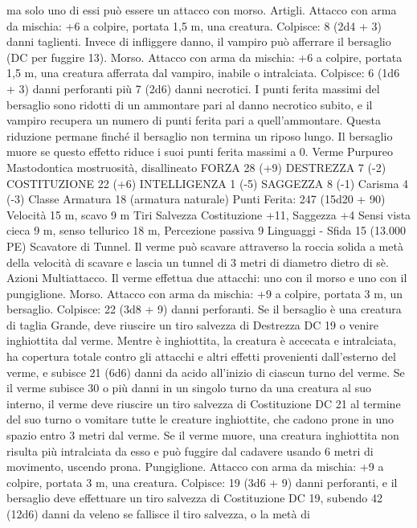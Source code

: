 \begin{multicols}{2}
ma solo uno di essi può essere un attacco con morso.
Artigli. Attacco con arma da mischia: +6 a colpire, portata 1,5
m, una creatura.
Colpisce: 8 (2d4 + 3) danni taglienti. Invece di infliggere danno,
il vampiro può afferrare il bersaglio (DC per fuggire 13).
Morso. Attacco con arma da mischia: +6 a colpire, portata 1,5 m,
una creatura afferrata dal vampiro, inabile o intralciata.
Colpisce: 6 (1d6 + 3) danni perforanti più 7 (2d6) danni necrotici. I
punti ferita massimi del bersaglio sono ridotti di un ammontare pari
al danno necrotico subito, e il vampiro recupera un numero di punti
ferita pari a quell’ammontare. Questa riduzione permane finché il
bersaglio non termina un riposo lungo. Il bersaglio muore se questo
effetto riduce i suoi punti ferita massimi a 0.
Verme Purpureo
Mastodontica mostruosità, disallineato
FORZA 28 (+9)
DESTREZZA 7 (-2)
COSTITUZIONE 22 (+6)
INTELLIGENZA 1 (-5)
SAGGEZZA 8 (-1)
Carisma 4 (-3)
Classe Armatura 18 (armatura naturale)
\hspace*{0pt}\hfill{Punti Ferita}: 247 (15d20 + 90)
Velocità 15 m, scavo 9 m
Tiri Salvezza Costituzione +11, Saggezza +4
Sensi vista cieca 9 m, senso tellurico 18 m, Percezione passiva 9
Linguaggi -
Sfida 15 (13.000 PE)
Scavatore di Tunnel. Il verme può scavare attraverso la roccia
solida a metà della velocità di scavare e lascia un tunnel di 3
metri di diametro dietro di sè.
Azioni
Multiattacco. Il verme effettua due attacchi: uno con il morso e
uno con il pungiglione.
Morso. Attacco con arma da mischia: +9 a colpire, portata 3 m,
un bersaglio.
Colpisce: 22 (3d8 + 9) danni perforanti. Se il bersaglio è una
creatura di taglia Grande, deve riuscire un tiro salvezza di
Destrezza DC 19 o venire inghiottita dal verme. Mentre è
inghiottita, la creatura è accecata e intralciata, ha copertura totale
contro gli attacchi e altri effetti provenienti dall’esterno del
verme, e subisce 21 (6d6) danni da acido all’inizio di ciascun
turno del verme.
Se il verme subisce 30 o più danni in un singolo turno da una
creatura al suo interno, il verme deve riuscire un tiro salvezza di
Costituzione DC 21 al termine del suo turno o vomitare tutte le
creature inghiottite, che cadono prone in uno spazio entro 3 metri
dal verme. Se il verme muore, una creatura inghiottita non risulta
più intralciata da esso e può fuggire dal cadavere usando 6 metri
di movimento, uscendo prona.
Pungiglione. Attacco con arma da mischia: +9 a colpire, portata
3 m, una creatura.
Colpisce: 19 (3d6 + 9) danni perforanti, e il bersaglio deve
effettuare un tiro salvezza di Costituzione DC 19, subendo 42
(12d6) danni da veleno se fallisce il tiro salvezza, o la metà di

\end{multicols}
